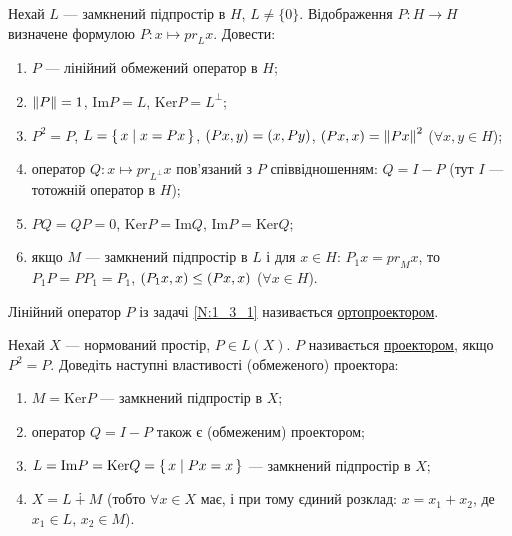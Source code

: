 
\begin{exercise}\label{N:1_3_1}
    Нехай $L$ --- замкнений підпростір в $H$, $L \neq \{0\}$. 
    Відображення $P: H \rightarrow H$ визначене формулою 
    $P: x \mapsto {pr}_L x$. Довести:
    \begin{enumerate}[label=\ukr*)]
        \item $P$ --- лінійний обмежений оператор в $H$;
        \item $\left\lVert P\right\rVert = 1$, $\mathrm{Im}P = L$, $\mathrm{Ker} P = L^\bot$;
        \item $P^2 = P$, $L = \set{x \mid x=Px}$, $\left(Px, y\right)=\left(x, Py\right)$,
        $\left(Px, x\right) = \left\lVert Px\right\rVert^2$ ($\forall x,y \in H$);
        \item оператор $Q: x \mapsto {pr}_{L^\bot}x$ пов'язаний з $P$ 
        співвідношенням: $Q = I-P$ (тут $I$ --- тотожній оператор в $H$);
        \item $PQ = QP = 0$, $\mathrm{Ker}P = \mathrm{Im}Q$, $\mathrm{Im}P = \mathrm{Ker}Q$;
        \item якщо $M$ --- замкнений підпростір в $L$ і для $x \in H$:
        $P_1 x = {pr}_M x$, то $P_1 P = P P_1 = P_1$,
        $\left(P_1x, x\right) \leq \left(Px, x\right)$ ($\forall x \in H$).
    \end{enumerate}
\end{exercise}

\begin{theory}
    Лінійний оператор $P$ із задачі \ref{N:1_3_1} називається \uline{ортопроектором}.
\end{theory}

\begin{exercise}\label{N:1_3_2}
    Нехай $X$ --- нормований простір, $P \in L(X)$.
    $P$ називається \uline{проектором}, якщо $P^2=P$. Доведіть наступні 
    властивості (обмеженого) проектора:
    \begin{enumerate}[label=\ukr*)]
        \item $M = \mathrm{Ker}P$ --- замкнений підпростір в $X$;
        \item оператор $Q = I - P$ також є (обмеженим) проектором;
        \item $L=\mathrm{Im}P=\mathrm{Ker}Q=\set{x \mid Px=x}$ --- замкнений підпростір в $X$;
        \item $X = L \dotplus M$ (тобто $\forall x \in X$ має, і при тому 
        єдиний розклад: $x=x_1+x_2$, де $x_1 \in L$, $x_2 \in M$).
    \end{enumerate}
\end{exercise}

